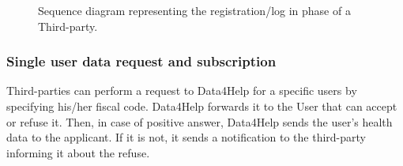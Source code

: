             \begin{figure}[H]
                \centering
                \caption{Sequence diagram representing the registration/log in phase of a Third-party.}
                \label{fig:seq-diagram2}
            \end{figure}
            
            
        \subsubsection{Single user data request and subscription}
            Third-parties can perform a request to Data4Help for a specific users by specifying his/her fiscal code. Data4Help forwards it to the User that can accept or refuse it. Then, in case of positive answer, Data4Help sends the user's health data to the applicant. If it is not, it sends a notification to the third-party informing it about the refuse.


